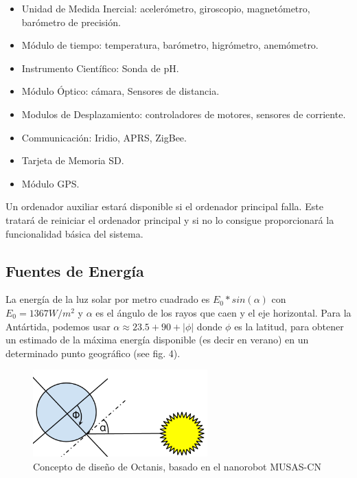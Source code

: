 \documentclass[a4paper,12pt]{article}
\begin{document}
\begin{itemize}
\item Unidad de Medida Inercial: acelerómetro, giroscopio, magnetómetro, barómetro de precisión.
\item Módulo de tiempo: temperatura, barómetro, higrómetro, anemómetro.
\item Instrumento Científico: Sonda de pH.
\item Módulo Óptico: cámara, Sensores de distancia.
\item Modulos de Desplazamiento: controladores de motores, sensores de corriente.
\item Communicación: Iridio, APRS, ZigBee.
\item Tarjeta de Memoria SD.
\item Módulo GPS.
\end{itemize}

Un ordenador auxiliar estará disponible si el ordenador principal falla. Este tratará de reiniciar el ordenador principal y si no lo consigue proporcionará la funcionalidad básica del sistema.



\subsection{Fuentes de Energía}

La energía de la luz solar por metro cuadrado es $E_0*sin(\alpha)$ con $E_0=1367 W/m^2$ \cite{solarc} y $\alpha$  es el ángulo de los rayos que caen y el eje horizontal. Para la Antártida, podemos usar $\alpha \approx 23.5+90+|\phi|$ donde $\phi$ es la latitud, para obtener un estimado de la máxima energía disponible (es decir en verano) en un determinado punto geográfico (see fig. 4).


\begin{figure}[h!]
	\centering
    \includegraphics[width=0.6\textwidth]{sun}
    \caption{Concepto de diseño de Octanis, basado en el nanorobot MUSAS-CN}
\end{figure}
\end{document}
